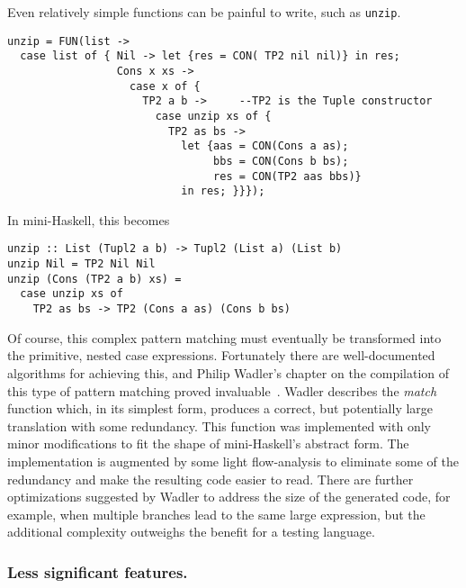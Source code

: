\documentclass{llncs}
\begin{document}
Even relatively simple functions can be painful to write, such as \texttt{unzip}.
\begin{verbatim}
unzip = FUN(list ->
  case list of { Nil -> let {res = CON( TP2 nil nil)} in res;
                 Cons x xs ->
                   case x of {
                     TP2 a b ->     --TP2 is the Tuple constructor
                       case unzip xs of {
                         TP2 as bs ->
                           let {aas = CON(Cons a as);
                                bbs = CON(Cons b bs);
                                res = CON(TP2 aas bbs)}
                           in res; }}});
\end{verbatim}
In mini-Haskell, this becomes
\begin{verbatim}
unzip :: List (Tupl2 a b) -> Tupl2 (List a) (List b)
unzip Nil = TP2 Nil Nil
unzip (Cons (TP2 a b) xs) =
  case unzip xs of
    TP2 as bs -> TP2 (Cons a as) (Cons b bs)
\end{verbatim}

Of course, this complex pattern matching must eventually be transformed into
the primitive, nested case expressions. Fortunately there are well-documented
algorithms for achieving this, and Philip Wadler's chapter
on the compilation of this type of pattern matching proved
invaluable~\cite{Jones:1987}.  Wadler describes the \emph{match} function
which, in its simplest form, produces a correct, but potentially large
translation with some redundancy.  This function was implemented with only
minor modifications to fit the shape of mini-Haskell's abstract form.  The
implementation is augmented by some light flow-analysis to eliminate some of
the redundancy and make the resulting code easier to read.  There are further
optimizations suggested by Wadler to address the size of the generated code,
for example, when multiple branches lead to the same large expression, but the
additional complexity outweighs the benefit for a testing language.


\subsubsection{Less significant features.}
\end{document}
